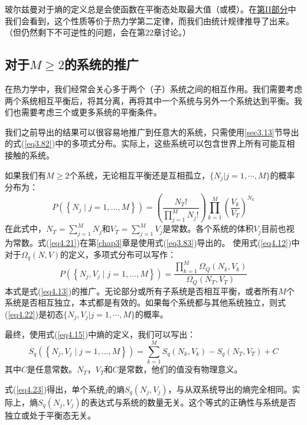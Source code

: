 \documentclass[UTF8]{ctexart}
\numberwithin{equation}{section}%
\numberwithin{figure}{section}%
\begin{document}
    玻尔兹曼对于熵的定义总是会使函数在平衡态处取最大值（或模）。在\hyperref[part2]{第II部分}中我们会看到，这个性质等价于热力学第二定律，而我们由统计规律推导了出来。（但仍然剩下不可逆性的问题，会在第22章讨论。）

    \subsection{\texorpdfstring{对于$M\geq2$的系统的推广}{对于M≥2的系统的推广}}\label{sec4.8}
    在热力学中，我们经常会关心多于两个（子）系统之间的相互作用。我们需要考虑两个系统相互平衡后，将其分离，再将其中一个系统与另外一个系统达到平衡。我们也需要考虑三个或更多系统的平衡条件。

    我们之前导出的结果可以很容易地推广到任意大的系统，只需使用\ref{sec3.13}节导出的式(\ref{eq3.82})中的多项式分布。实际上，这些系统可以包含世界上所有可能互相接触的系统。

    如果我们有$M\geq 2$个系统，无论相互平衡还是互相孤立，$\{N_j|j=1,\cdots,M\}$的概率分布为：
    \begin{equation}\label{eq4.21}
        P\left(\left\{N_{j} \mid j=1, \ldots, M\right\}\right)=\left(\frac{N_{T} !}{\prod_{j=1}^{M} N_{j} !}\right) \prod_{k=1}^{M}\left(\frac{V_{k}}{V_{T}}\right)^{N_{k}}
    \end{equation}
    在此式中，$N_T=\sum^M_{j=1}N_j$和$V_T=\sum^M_{j=1}V_j$是常数。各个系统的体积$V_j$目前也视为常数。式(\ref{eq4.21})在第\ref{chap3}章是使用式(\ref{eq3.83})导出的。
    使用式(\ref{eq4.12})中对于$\Omega_q(N,V)$的定义，多项式分布可以写作：
    \begin{equation}\label{eq4.22}
        P\left(\left\{N_{j}, V_{j} \mid j=1, \ldots, M\right\}\right)=\frac{\prod_{k=1}^{M} \Omega_{Q}\left(N_{k}, V_{k}\right)}{\Omega_{Q}\left(N_{T}, V_{T}\right)}
    \end{equation}
    本式是式(\ref{eq4.13})的推广。无论部分或所有子系统是否相互平衡，或者所有$M$个系统是否相互独立，本式都是有效的。如果每个系统都与其他系统独立，则式(\ref{eq4.22})是初态$\{N_j,V_j|j=1,\cdots,M\}$的概率。

    最终，使用式(\ref{eq4.15})中熵的定义，我们可以写出：
    \begin{equation}\label{eq4.23}
        S_{q}\left(\left\{N_{j}, V_{j} \mid j=1, \ldots, M\right\}\right)=\sum_{k=1}^{M} S_{q}\left(N_{k}, V_{k}\right)-S_{q}\left(N_{T}, V_{T}\right)+C
    \end{equation}
    其中$C$是任意常数。$N_T$，$V_T$和$C$是常数，他们的值没有物理意义。

    式(\ref{eq4.23})得出，单个系统$j$的熵$S_q(N_j,V_j)$，与从双系统导出的熵完全相同。实际上，熵$S_q(N_j,V_j)$的表达式与系统的数量无关。这个等式的正确性与系统是否独立或处于平衡态无关。
\end{document}
